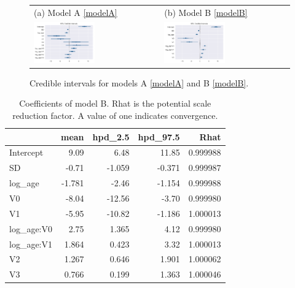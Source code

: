 \begin{figure}
  \centering
    \begin{tabular}{ll}
(a) Model A \eqref{modelA} & (b) Model B \eqref{modelB}\\
\includegraphics[width=0.5\textwidth]{images/DS19fm0_c0__forestplot_model_A.pdf}&
\includegraphics[width=0.5\textwidth]{images/DS19fk1_c0__forestplot_model_B}\\
\end{tabular}
    \caption{Credible intervals for models A \eqref{modelA} and B \eqref{modelB}.}
    \label{fig:forest_plots}
\end{figure}

\begin{table}
\caption{\label{tab:coeff} Coefficients of model B. Rhat is the
  potential scale reduction factor. A value of one indicates
  convergence.}
\centering
\begin{tabular}{lrrrr}
\hline
\hline
{} &      mean &    hpd\_2.5 &   hpd\_97.5 &      Rhat \\
\hline
Intercept  &  9.09 &   6.48 &  11.85 &  0.999988 \\
SD        & -0.71 &  -1.059 &  -0.371 &  0.999987 \\
log\_age    & -1.781 &  -2.46 &  -1.154 &  0.999988 \\
V0         & -8.04 & -12.56 &  -3.70 &  0.999980 \\
V1         & -5.95 & -10.82 &  -1.186 &  1.000013 \\
log\_age:V0 &  2.75 &   1.365 &   4.12 &  0.999980 \\
log\_age:V1 &  1.864 &   0.423 &   3.32 &  1.000013 \\
V2         &  1.267 &   0.646 &   1.901 &  1.000062 \\
V3         &  0.766 &   0.199 &   1.363 &  1.000046 \\
\hline
\hline
\end{tabular}
\end{table}


